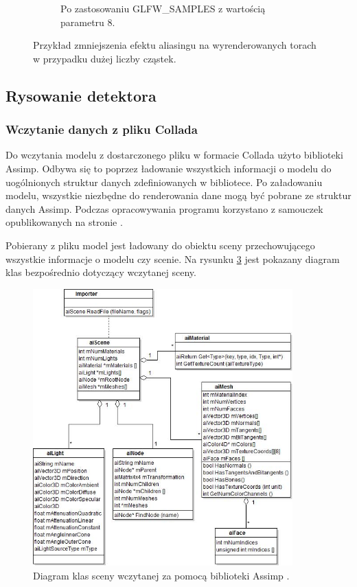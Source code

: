\begin{figure}[H]
\begin{subfigure}{0.5\textwidth}
    	\caption{Po zastosowaniu GLFW\_SAMPLES z wartością parametru 8.}
		\label{rys16}
	\end{subfigure}
    \caption{Przykład zmniejszenia efektu aliasingu na wyrenderowanych torach w przypadku dużej liczby cząstek.}
    \label{rys17}
\end{figure}


\newpage
\subsection{Rysowanie detektora}
\subsubsection{Wczytanie danych z pliku Collada}
Do wczytania modelu z dostarczonego pliku w formacie Collada użyto biblioteki Assimp. Odbywa się to poprzez ładowanie wszystkich informacji o modelu do uogólnionych struktur danych zdefiniowanych w bibliotece. Po załadowaniu modelu, wszystkie niezbędne do renderowania dane mogą być pobrane ze struktur danych Assimp. Podczas opracowywania programu korzystano z samouczek opublikowanych na stronie \cite{learnopengl}. 

Pobierany z pliku model jest ładowany do obiektu sceny przechowującego wszystkie informacje o modelu czy scenie. Na rysunku \ref{rys14} jest pokazany diagram klas bezpośrednio dotyczący wczytanej sceny.
\begin{figure}[H]
		\centering
 		\includegraphics[width=10.0cm]{assimpClasses.jpg}
    	\caption{Diagram klas sceny wczytanej za pomocą biblioteki Assimp \cite{assimpImport}.}
 		\label{rys14}
\end{figure}

